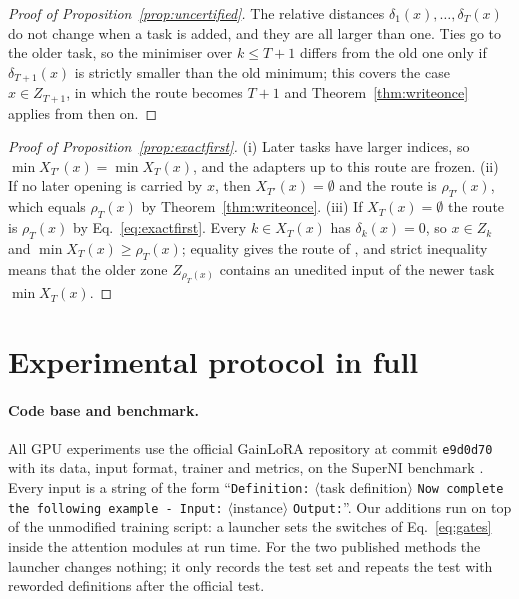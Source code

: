 \begin{proof}[Proof of Proposition~\ref{prop:uncertified}]
The relative distances $\delta_1(x), \dots, \delta_T(x)$ do not change when a task is added, and
they are all larger than one. Ties go to the older task, so the minimiser over $k \le T+1$ differs
from the old one only if $\delta_{T+1}(x)$ is strictly smaller than the old minimum; this covers
the case $x \in Z_{T+1}$, in which the route becomes $T+1$ and Theorem~\ref{thm:writeonce} applies
from then on.
\end{proof}

\begin{proof}[Proof of Proposition~\ref{prop:exactfirst}]
(i) Later tasks have larger indices, so $\min X_{T'}(x) = \min X_T(x)$, and the adapters up to this
route are frozen. (ii) If no later opening is carried by $x$, then $X_{T'}(x) = \emptyset$ and the
route is $\rho_{T'}(x)$, which equals $\rho_T(x)$ by Theorem~\ref{thm:writeonce}. (iii) If $X_T(x)=\emptyset$ the route is $\rho_T(x)$ by Eq.~\eqref{eq:exactfirst}. Every $k\in X_T(x)$ has $\delta_k(x)=0$, so $x\in Z_k$ and $\min X_T(x)\ge\rho_T(x)$; equality gives the route of \cert{}, and strict inequality means that the older zone $Z_{\rho_T(x)}$ contains an unedited input of the newer task $\min X_T(x)$.
\end{proof}




\FloatBarrier
\section{Experimental protocol in full}
\label{app:cut}

\paragraph{Code base and benchmark.} All GPU experiments use the official GainLoRA repository at
commit \texttt{e9d0d70} with its data, input format, trainer and metrics, on the SuperNI benchmark
\citep{wang2022superni}. Every input is a string of the form ``\texttt{Definition:}
$\langle$task definition$\rangle$ \texttt{Now complete the following example - Input:}
$\langle$instance$\rangle$ \texttt{Output:}''. Our additions run on top of the unmodified training
script: a launcher sets the switches of Eq.~\eqref{eq:gates} inside the attention modules at run
time. For the two published methods the launcher changes nothing; it only records the test set and
repeats the test with reworded definitions after the official test.

